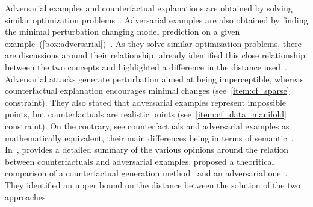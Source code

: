 \documentclass[../main.tex]{subfiles}
\begin{document}
	Adversarial examples and counterfactual explanations are obtained by solving similar optimization problems~\cite{Pawelczyk2021ExploringCE,Freiesleben2021}.
	Adversarial examples are also obtained by finding the minimal perturbation changing model prediction on a given example~(\cref{box:adversarial})~\cite{Szegedy2013IntriguingPO}.
	As they solve similar optimization problems, there are discussions around their relationship.
	\citeauthor{wachter2017counterfactual} already identified this close relationship between the two concepts and highlighted a difference in the distance used~\cite{wachter2017counterfactual}.
	Adversarial attacks generate perturbation aimed at being imperceptible, whereas counterfactual explanation encourages minimal changes (see~\ref{item:cf_sparse} constraint).
	They also stated that adversarial examples represent impossible points, but counterfactuals are realistic points (see~\ref{item:cf_data_manifold} constraint).
	On the contrary, \citeauthor{browne2020} see counterfactuals and adversarial examples as mathematically equivalent, their main differences being in terms of semantic~\cite{browne2020}.
	In~\cite{Freiesleben2021}, \citeauthor{Freiesleben2021} provides a detailed summary of the various opinions around the relation between counterfactuals and adversarial examples.
	\citeauthor{Pawelczyk2021ExploringCE} proposed a theoritical comparison of a counterfactual generation method~\cite{wachter2017counterfactual} and an adversarial one~\cite{Carlini2016TowardsET}.
	They identified an upper bound on the distance between the solution of the two approaches~\cite{Pawelczyk2021ExploringCE}.
\end{document}
